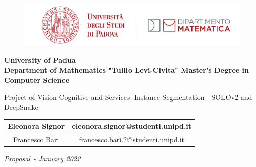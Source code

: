 \documentclass[10pt,a4paper, italian]{article}
\begin{document}
\begin{figure}[H]
\centering
  \includegraphics[width=0.6\linewidth]{./img/logo_dip.png}
   \label{fig: logo-unip-dipartimento-matematica}
\end{figure}
\vspace{1cm}
\begin{center}\Large{\textbf{University of Padua \\ Department of Mathematics "Tullio Levi-Civita" Master's Degree in Computer Science}}\end{center}
\vspace{5cm}
\begin{center}\Large{Project of Vision Cognitive and Services: Instance Segmentation - SOLOv2 and DeepSnake\\ }\end{center}
\begin{flushright} 
\vspace{1cm}

\begin{table}[h]
\begin{center}
\begin{tabular}{|c|c|}
\hline
Eleonora Signor & eleonora.signor@studenti.unipd.it\\
\hline
Francesco Bari & francesco.bari.2@studenti.unipd.it \\
\hline
\end{tabular}
\end{center}
\end{table}

\vspace{4cm}
\textit{Proposal - January 2022}\\
\end{flushright}
\pagebreak

\setcounter{section}{0}
\setcounter{page}{1}
\newpage
\end{document}
